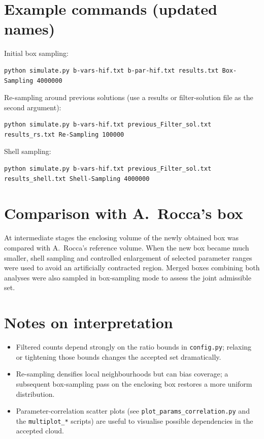 \section{Example commands (updated names)}
Initial box sampling:

\begin{lstlisting}
python simulate.py b-vars-hif.txt b-par-hif.txt results.txt Box-Sampling 4000000
\end{lstlisting}

Re-sampling around previous solutions (use a results or filter-solution file as
the second argument):

\begin{lstlisting}
python simulate.py b-vars-hif.txt previous_Filter_sol.txt results_rs.txt Re-Sampling 100000
\end{lstlisting}

Shell sampling:

\begin{lstlisting}
python simulate.py b-vars-hif.txt previous_Filter_sol.txt results_shell.txt Shell-Sampling 4000000
\end{lstlisting}

\section{Comparison with A.~Rocca's box}
At intermediate stages the enclosing volume of the newly obtained box was
compared with A.~Rocca's reference volume. When the new box became much smaller,
shell sampling and controlled enlargement of selected parameter ranges were used
to avoid an artificially contracted region. Merged boxes combining both analyses
were also sampled in box-sampling mode to assess the joint admissible set.

\section{Notes on interpretation}
\begin{itemize}
  \item Filtered counts depend strongly on the ratio bounds in
  \texttt{config.py}; relaxing or tightening those bounds changes the accepted
  set dramatically.
  \item Re-sampling densifies local neighbourhoods but can bias coverage; a
  subsequent box-sampling pass on the enclosing box restores a more uniform
  distribution.
  \item Parameter-correlation scatter plots (see
  \texttt{plot\_params\_correlation.py} and the \texttt{multiplot\_*} scripts)
  are useful to visualise possible dependencies in the accepted cloud.
\end{itemize}
